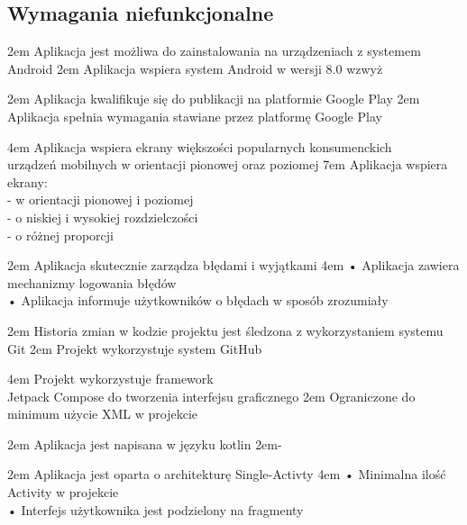 \newpage

\subsection{Wymagania niefunkcjonalne}

{2em}{
    Aplikacja jest możliwa do zainstalowania na urządzeniach z systemem Android
}
{2em}{
    Aplikacja wspiera system Android w wersji 8.0 wzwyż
}

{2em}{
    Aplikacja kwalifikuje się do publikacji na platformie Google Play
}
{2em}{
    Aplikacja spełnia wymagania stawiane przez platformę Google Play
}

{4em}{
    Aplikacja wspiera ekrany większości popularnych konsumenckich\\
    urządzeń mobilnych w orientacji pionowej oraz poziomej
}
{7em}{
    Aplikacja wspiera ekrany:\\
    - w orientacji pionowej i poziomej\\
    - o niskiej i wysokiej rozdzielczości\\
    - o różnej proporcji
}

{2em}{
    Aplikacja skutecznie zarządza błędami i wyjątkami
}
{4em}{
    • Aplikacja zawiera mechanizmy logowania błędów\\
    • Aplikacja informuje użytkowników o błędach w sposób zrozumiały
}

{2em}{
    Historia zmian w kodzie projektu jest śledzona z wykorzystaniem systemu Git
}
{2em}{
    Projekt wykorzystuje system GitHub
}

{4em}{
    Projekt wykorzystuje framework\\
    Jetpack Compose do tworzenia interfejsu graficznego
}
{2em}{
    Ograniczone do minimum użycie XML w projekcie
}

{2em}{
    Aplikacja jest napisana w języku kotlin
}
{2em}{-}

{2em}{
    Aplikacja jest oparta o architekturę Single-Activty
}
{4em}{
    • Minimalna ilość Activity w projekcie\\
    • Interfejs użytkownika jest podzielony na fragmenty
}

